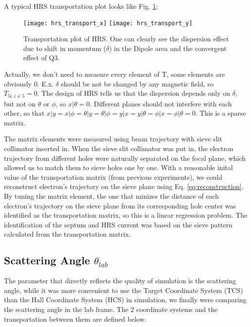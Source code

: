 A typical HRS transportation plot looks like Fig. \ref{fig:hrs_transport}:
\begin{figure}[H]
    \texttt{[image: hrs\_transport\_x]}
    \texttt{[image: hrs\_transport\_y]}
    \caption{Transportation plot of HRS. One can clearly see the dispersion effect
    due to shift in momentum ($\delta$) in the Dipole area and the convergent effect
    of Q3.}
    \label{fig:hrs_transport}
\end{figure}

Actually, we don't need to measure every element of T, some elements are obviously
0. E.x. $\delta$ should be not be changed by any magnetic field, so $T_{5i, i\ne 5} = 0$.
The design of HRS tells us that the dispersion depends only on $\delta$, but not
on $\theta$ or $\phi$, so $x|\theta = 0$. Different planes should not
interfere with each other, so that $x|y = x|\phi = \theta|y = \theta|\phi 
= y|x = y|\theta = \phi|x = \phi|\theta = 0$. This is a sparse matrix.

The matrix elements were measured using beam trajectory with sieve slit collimator
inserted in. When the sieve slit collimator was put in, the electron trajectory
from different holes were naturally separated on the focal plane, which allowed
us to match them to sieve holes one by one. With a reasonable inital value of 
the transportation matrix (from previous experiments),
we could reconstruct electron's trajectory on the sieve plane using Eq. \ref{eq:reconstruction}.
By tuning the matrix element, the one that minizes the distance of each electron's trajectory on the sieve
plane from its corresponding hole center was identified as the transportation
matrix, so this is a linear regression problem. The identification of the septum 
and HRS current was based on the sieve pattern calculated from the 
transportation matrix. 


\subsection{Scattering Angle $\theta_{lab}$}
The parameter that directly reflects the quality of simulation is the scattering
angle, while it was more convenient to use the Target Coordinate System (TCS) 
than the Hall Coordinate System (HCS) in simulation, we finally were comparing
the scattering angle in the lab frame. The 2 coordinate systems and the transportation
between them are defined below.

